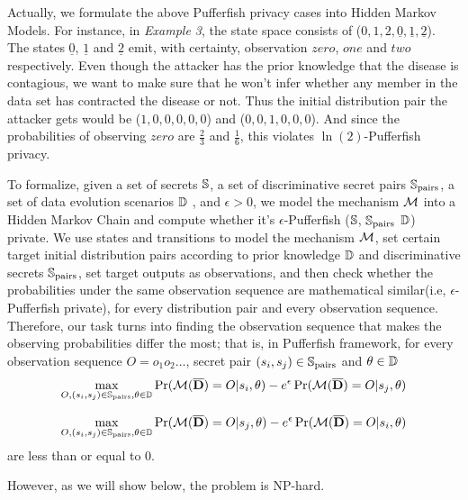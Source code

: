 
Actually, we formulate the above Pufferfish privacy cases into Hidden Markov Models.
For instance, in \textit{Example 3}, the state space consists of ($0, 1, 2, \underline{0}, \underline{1}, \underline{2}$).
The states $\underline{0}$, $\underline{1}$ and $\underline{2}$ emit, with certainty,
observation $\textit{zero}$, $\textit{one}$ and $\textit{two}$ respectively.
Even though the attacker has the prior knowledge that the disease is contagious,
we want to make sure that he won't infer whether any member in the data set
has contracted the disease or not. Thus the initial distribution pair the attacker gets would be
($1,0,0,0,0,0$) and ($0,0,1,0,0,0$). And since the probabilities of observing
$\textit{zero}$ are $\frac{2}{3}$ and $\frac{1}{6}$, this violates $\ln(2)$-Pufferfish privacy.

To formalize, given a set of secrets $\mathbb{S}$,
a set of discriminative secret pairs $\mathbb{S}_{\textmd{pairs}}$, a set of data evolution
scenarios $\mathbb{D}$ , and $\epsilon > 0$, we model the mechanism  $\mathcal{M}$ into a Hidden Markov Chain
and compute whether it's $\epsilon$-Pufferfish ($\mathbb{S}$, $\mathbb{S}_{\textmd{pairs}}$
$\mathbb{D}$) private. We use states and transitions to model the mechanism $\mathcal{M}$,
set certain target initial distribution pairs according to prior knowledge $\mathbb{D}$ and discriminative secrets $\mathbb{S}_{\textmd{pairs}}$,
set target outputs as observations, and then check whether the probabilities under the same observation sequence
are mathematical similar(i.e, $\epsilon$-Pufferfish private), for every distribution pair and every observation sequence.
Therefore, our task turns into finding the observation sequence that makes the observing probabilities differ the most;
that is, in Pufferfish framework, for every observation sequence $O=o_1o_2\ldots$, secret pair $(s_i, s_j) \in
\mathbb{S}_{\textmd{pairs}}$ and $\theta \in \mathbb{D}$
  \begin{equation}\label{max1}
     \max_{O,(s_i, s_j) \in
    \mathbb{S}_{\textmd{pairs}},\theta \in \mathbb{D}}
    { \Pr (\mathcal{M} (\overline{\mathbf{D}}) = O| s_i, \theta) - e^\epsilon \Pr (\mathcal{M} (\overline{\mathbf{D}}) = O| s_j, \theta) }
  \end{equation}

  \begin{equation}\label{max2}
     \max_{O,(s_i, s_j) \in
    \mathbb{S}_{\textmd{pairs}},\theta \in \mathbb{D}}
     { \Pr (\mathcal{M} (\overline{\mathbf{D}}) = O| s_j, \theta) - e^\epsilon \Pr (\mathcal{M} (\overline{\mathbf{D}}) = O| s_i, \theta) }
  \end{equation}
are less than or equal to 0.

However, as we will show below, the problem is NP-hard.

